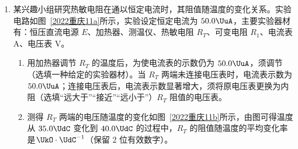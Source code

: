 \documentclass[\gkver]{gaokaozhenti}
\begin{document}
\begin{enumerate}
{$mg\sin 45^\circ - F - f = ma_{2}$

解得

$a_{2} = \frac{\sqrt 2}{2}g - 2\mu g\cos 45^\circ = \frac{\sqrt 2}{6}g$

则拉力分别沿斜面向上和向下时，物块的加速度大小之比为

$\frac{a_{2}}{a_{1}} = \frac{1}{3}$

故 C 正确；

B．当拉力沿斜面向上，重力做功为

$W_{\text{G2}} = mg\sin 45^\circ \cdot x$

合力做功为

$W_{\text{合}} = ma_{2} \cdot x$

则其比值为

$\frac{W_{\text{G2}}}{W_{\text{合}}} = \frac{\frac{\sqrt 2}{2}g}{\frac{\sqrt 2}{6}g} = \frac{3}{1}$

则重力做功为 $9\UJ$ 时，物块的动能即合外力做功为 $3\UJ$，故 B 正确；

D．当拉力分别沿斜面向上和向下时，物块滑到底端时的动量大小为

$P = mv = m\sqrt{2ax}$

则动量的大小之比为

$\frac{P_{2}}{P_{1}} = \frac{\sqrt{a_{2}}}{\sqrt{a_{1}}} = \frac{1}{\sqrt 3}$

故 D 错误。

故选 BC。
}

\item
某兴趣小组研究热敏电阻在通以恒定电流时，其阻值随温度的变化关系。实验电路如图~\ref{2022重庆11a}所示，实验设定恒定电流为 $50.0\UuA$，主要实验器材有：恒压直流电源 $E$、加热器、测温仪、热敏电阻 $R_{T}$、可变电阻 $R_{1}$、电流表 A、电压表 V。
\begin{enumerate}
	\item
	用加热器调节 $R_{T}$ 的温度后，为使电流表的示数仍为 $50.0\UuA$，须调节（选填一种给定的实验器材）。当 $R_{T}$ 两端未连接电压表时，电流表示数为 $50.0\UuA$；连接电压表后，电流表示数显著增大，须将原电压表更换为内阻（选填“远大于”“接近”“远小于”）$R_{T}$ 阻值的电压表。
	\item
	测得 $R_{T}$ 两端的电压随温度的变化如图~\ref{2022重庆11b}所示，由图可得温度从 $35.0\UdC$ 变化到 $40.0\UdC$ 的过程中，$R_{T}$ 的阻值随温度的平均变化率是$\UkO \cdot \UdC^{-1}$（保留 2 位有效数字）。
\end{enumerate}


\end{enumerate}
\end{document}
